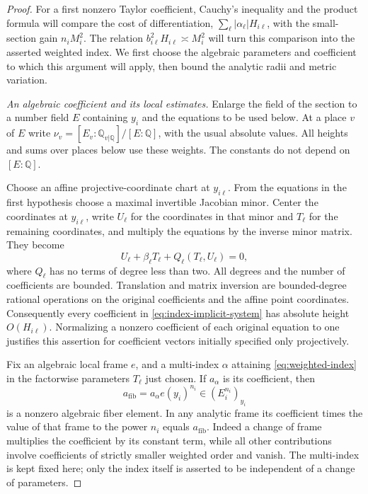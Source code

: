 \begin{proof}
For a first nonzero Taylor coefficient, Cauchy's inequality and the
product formula will compare the cost of differentiation,
\(\sum_\ell|\alpha_\ell|H_{i\ell}\), with the small-section gain
\(n_iM_i^2\).  The relation \(b_{i\ell}^2H_{i\ell}\asymp M_i^2\)
will turn this comparison into the asserted weighted index.  We first
choose the algebraic parameters and coefficient to which this argument
will apply, then bound the analytic radii and metric variation.

\emph{An algebraic coefficient and its local estimates.}
Enlarge the field of the section to a number field $E$ containing
$y_i$ and the equations to be used below.  At a place $v$ of $E$ write
$\nu_v=[E_v:\mathbb Q_{v|\mathbb Q}]/[E:\mathbb Q]$, with the usual
absolute values.  All heights and sums over places below use these
weights.  The constants do not depend on $[E:\mathbb Q]$.

Choose an affine projective-coordinate chart at $y_{i\ell}$.
From the equations in the first hypothesis choose a maximal invertible
Jacobian minor.  Center the coordinates at $y_{i\ell}$, write
$U_\ell$ for the coordinates in that minor and $T_\ell$ for the
remaining coordinates, and multiply the equations by the inverse
minor matrix.  They become
\begin{equation}\label{eq:index-implicit-system}
 U_\ell+\beta_\ell T_\ell+Q_\ell(T_\ell,U_\ell)=0,
\end{equation}
where $Q_\ell$ has no terms of degree less than two.  All degrees and
the number of coefficients are bounded.  Translation and matrix
inversion are bounded-degree rational operations on the original
coefficients and the affine point coordinates.  Consequently every
coefficient in \eqref{eq:index-implicit-system} has absolute height
$O(H_{i\ell})$.  Normalizing a nonzero coefficient of each original
equation to one justifies this assertion for coefficient vectors
initially specified only projectively.

Fix an algebraic local frame $e$, and a multi-index $\alpha$ attaining
\eqref{eq:weighted-index} in the factorwise parameters $T_\ell$ just
chosen.  If $a_\alpha$ is its coefficient, then
\[
 a_{\mathrm{fib}}=a_\alpha e(y_i)^{n_i}
       \in (E_i^{n_i})_{y_i}
\]
is a nonzero algebraic fiber element.  In any analytic frame its
coefficient times the value of that frame to the power $n_i$ equals
$a_{\mathrm{fib}}$.  Indeed a change of frame multiplies the
coefficient by its constant term, while all other contributions
involve coefficients of strictly smaller weighted order and vanish.
The multi-index is kept fixed here; only the index itself is asserted
to be independent of a change of parameters.


\end{proof}
